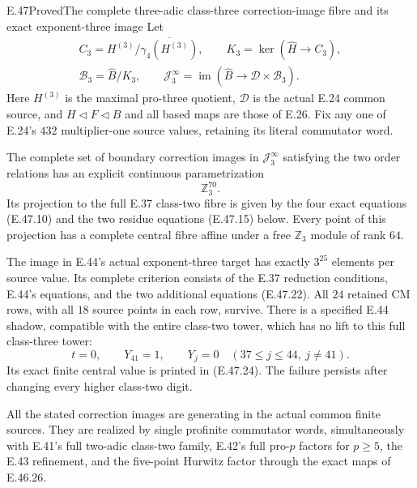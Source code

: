 \begin{statement}{E.47}{Proved}{The complete three-adic class-three correction-image fibre and its exact exponent-three image}
Let
\[
 \begin{gathered}
 C_3=H^{(3)}/\overline{\gamma_4(H^{(3)})},\qquad
 K_3=\ker(\widehat H\longrightarrow C_3),\\
 \mathcal B_3=\widehat B/K_3,\qquad
 \mathscr J_3^{\infty}
 =\operatorname{im}(\widehat B\longrightarrow
                  \mathscr D\times\mathcal B_3).
 \end{gathered}
 \tag{E.47.1}
\]
Here $H^{(3)}$ is the maximal pro-three quotient,
$\mathscr D$ is the actual E.24 common source, and
$H\triangleleft F\triangleleft B$ and all based maps
are those of E.26.  Fix any one of E.24's $432$
multiplier-one source values, retaining its literal
commutator word.

The complete set of boundary correction images in
$\mathscr J_3^{\infty}$ satisfying the two order
relations has an explicit continuous parametrization
\[
                         \mathbb Z_3^{70}.
 \tag{E.47.2}
\]
Its projection to the full E.37 class-two fibre is
given by the four exact equations
\textup{(E.47.10)} and the two residue equations
\textup{(E.47.15)} below.  Every point of this
projection has a complete central fibre affine
under a free $\mathbb Z_3$ module of rank $64$.

The image in E.44's actual exponent-three target
has exactly $3^{25}$ elements per source value.
Its complete criterion consists of the E.37
reduction conditions, E.44's equations, and the
two additional equations \textup{(E.47.22)}.
All $24$ retained CM rows, with all $18$ source
points in each row, survive.
There is a specified E.44 shadow, compatible
with the entire class-two tower, which has no
lift to this full class-three tower:
\[
 t=0,\qquad Y_{41}=1,\qquad
 Y_j=0\quad(37\leq j\leq44,\ j\ne41).
 \tag{E.47.3}
\]
Its exact finite central value is printed in
\textup{(E.47.24)}.  The failure persists after
changing every higher class-two digit.

All the stated correction images are generating
in the actual common finite sources.  They are
realized by single profinite commutator words,
simultaneously with E.41's full two-adic class-two
family, E.42's full pro-$p$ factors for $p\geq5$,
the E.43 refinement, and the five-point Hurwitz
factor through the exact maps of E.46.26.
\end{statement}
